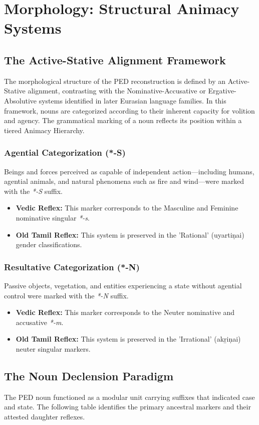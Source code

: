 \chapter{Morphology: Structural Animacy Systems}

\section{The Active-Stative Alignment Framework}
The morphological structure of the PED reconstruction is defined by an Active-Stative alignment, contrasting with the Nominative-Accusative or Ergative-Absolutive systems identified in later Eurasian language families. In this framework, nouns are categorized according to their inherent capacity for volition and agency. The grammatical marking of a noun reflects its position within a tiered Animacy Hierarchy.

\subsection{Agential Categorization (*-S)}
Beings and forces perceived as capable of independent action—including humans, agential animals, and natural phenomena such as fire and wind—were marked with the \textit{*-S} suffix. 
\begin{itemize}
    \item \textbf{Vedic Reflex:} This marker corresponds to the Masculine and Feminine nominative singular \textit{*-s}.
    \item \textbf{Old Tamil Reflex:} This system is preserved in the 'Rational' (uyartiṇai) gender classifications.
\end{itemize}

\subsection{Resultative Categorization (*-N)}
Passive objects, vegetation, and entities experiencing a state without agential control were marked with the \textit{*-N} suffix.
\begin{itemize}
    \item \textbf{Vedic Reflex:} This marker corresponds to the Neuter nominative and accusative \textit{*-m}.
    \item \textbf{Old Tamil Reflex:} This system is preserved in the 'Irrational' (akṟiṇai) neuter singular markers.
\end{itemize}

\section{The Noun Declension Paradigm}
The PED noun functioned as a modular unit carrying suffixes that indicated case and state. The following table identifies the primary ancestral markers and their attested daughter reflexes.

